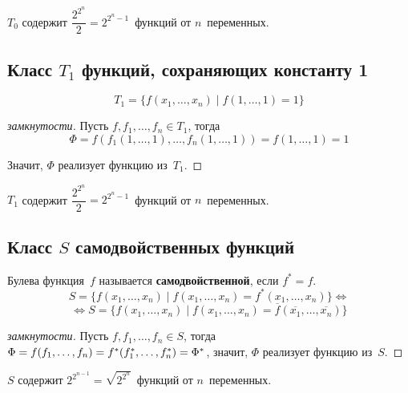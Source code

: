 $T_0$ содержит $\dfrac{2^{2^n}}2 = 2^{2^n - 1}$~функций от $n$~переменных.

\subsection{Класс \texorpdfstring{$T_1$}{} функций, сохраняющих константу 1}
\begin{equation*}
T_1 = \{ f(x_1, \ldots, x_n) \mid f(1, \ldots, 1) = 1 \}
\end{equation*}
\begin{proof}[замкнутости]
Пусть $f, f_1, \ldots, f_n \in T_1$, тогда
\begin{equation*}
\Phi =
f(f_1(1, \ldots, 1), \ldots, f_n(1, \ldots, 1)) =
f(1, \ldots, 1) = 1
\end{equation*}

Значит, $\Phi$ реализует функцию из~$T_1$.
\end{proof}

$T_1$ содержит $\dfrac{2^{2^n}}2 = 2^{2^n - 1}$~функций от $n$~переменных.

\subsection{Класс \texorpdfstring{$S$}{} самодвойственных функций}
 Булева функция~$f$ называется \textbf{самодвойственной}, если $f^* = f$.
\begin{equation*}
S = \{ f(x_1, \ldots, x_n) \mid
f(x_1, \ldots, x_n) = f^*(x_1, \ldots, x_n) \} \Leftrightarrow
\end{equation*}
\begin{equation*}
\Leftrightarrow S = \{ f(x_1, \ldots, x_n) \mid
f(x_1, \ldots, x_n) = \overline f(\overline{x_1}, \ldots, \overline{x_n}) \}
\end{equation*}
\begin{proof}[замкнутости]
Пусть $f, f_1, \ldots, f_n \in S$, тогда $\Phi = f(f_1, \ldots, f_n) \opbr= f^*(f_1^*, \ldots, f_n^*) \opbr= \Phi^*$, значит, $\Phi$ реализует функцию из~$S$.
\end{proof}

$S$ содержит $2^{2^{n-1}} = \sqrt{2^{2^n}}$~функций от $n$~переменных.

